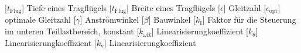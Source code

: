 \documentclass[
	pagesize,
	fontsize=12pt,
	paper=a4,
	oneside,
    reqno
]{scrartcl}
\numberwithin{equation}{section} %
\numberwithin{table}{section} %
\numberwithin{figure}{section} %
\begin{document}
\begin{acronym}[Symbols]
        [$t_{\mathrm{Flug}}$]       {Tiefe eines Tragflügels}
        [$t_{\mathrm{Flug}}$]       {Breite eines Tragflügels}
          [$\epsilon$]                {Gleitzahl}
       [$\epsilon_{\mathrm{opt}}$] {optimale Gleitzahl}
        [$\gamma$]                  {Anströmwinkel}
         [$\beta$]                   {Bauwinkel}
           [$k_{\mathrm{I}}$]          {Faktor für die Steuerung im unteren Teillastbereich, konstant}
      [$k_{\omega\mathrm{R}}$]   {Linearisierungkoeffizient}
       [$k_{\theta}$]     {Linearisierungkoeffizient}
           [$k_{\mathrm{v}}$]          {Linearisierungkoeffizient}
    \end{acronym}
\clearpage














\newpage
\newcount\Quellennummer
{}

\renewcommand\refname{Literaturverzeichnis}
\end{document}
